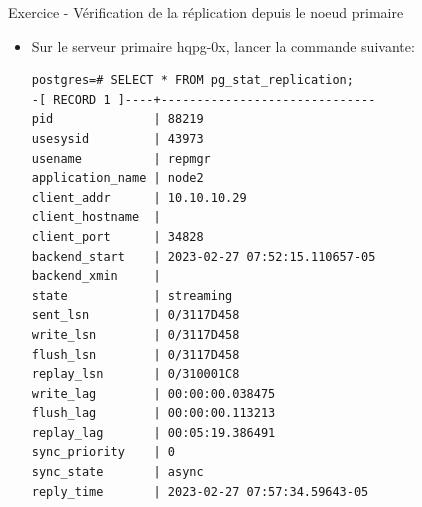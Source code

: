 
\begin{frame}[fragile]{Exercice - Vérification de la réplication depuis le noeud primaire}

   \begin{itemize}
      \item Sur le serveur primaire hqpg-0x, lancer la commande suivante:
\begin{tiny}
\begin{Verbatim}[commandchars=\&\{\}]
postgres=# SELECT * FROM pg_stat_replication;
-[ RECORD 1 ]----+------------------------------
pid              | 88219
usesysid         | 43973
usename          | repmgr
application_name | node2
client_addr      | 10.10.10.29
client_hostname  | 
client_port      | 34828
backend_start    | 2023-02-27 07:52:15.110657-05
backend_xmin     | 
state            | streaming
sent_lsn         | 0/3117D458
write_lsn        | 0/3117D458
flush_lsn        | 0/3117D458
replay_lsn       | 0/310001C8
write_lag        | 00:00:00.038475
flush_lag        | 00:00:00.113213
replay_lag       | 00:05:19.386491
sync_priority    | 0
sync_state       | async
reply_time       | 2023-02-27 07:57:34.59643-05

\end{Verbatim}
\end{tiny}
   \end{itemize}

\end{frame}


